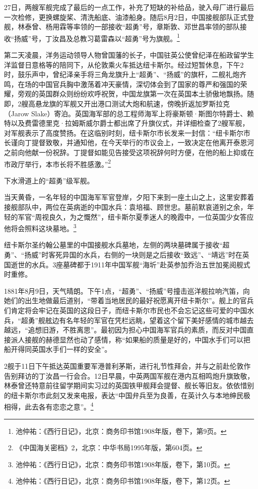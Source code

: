 \documentclass[12pt,UTF8]{ctexbook}
\begin{document}
27日，两艘军舰完成了最后的一点工作，补充了短缺的补给品，驶入母厂进行最后一次检修，更换螺旋桨、清洗船底、油漆船身。随后8月2日，中国接舰部队正式登舰，林泰曾、杨用霖等率领的一部接收“超勇”号，章斯敦、邓世昌率领的部队接收“扬威”号，丁汝昌及总教习葛雷森以“超勇”号为旗舰。\footnote{池仲祐：《西行日记》，北京：商务印书馆1908年版，卷下，第9页。}

第二天凌晨，洋务运动领导人物曾国藩的长子，中国驻英公使曾纪泽在船政留学生洋监督日意格等的陪同下，从伦敦乘火车抵达纽卡斯尔。经过短暂休息，下午2时，鼓乐声中，曾纪泽亲手将三角龙旗升上“超勇”、“扬威”的旗杆，二舰礼炮齐鸣，在场的中国官兵胸中激荡着冲天豪情，深切体会到了国家的尊严和强国的荣耀，旁观的英国群众则纷纷欢呼祝贺，中国龙旗第一次在英国本土骄傲地飘扬。随即，2艘高悬龙旗的军舰又开出港口测试大炮和航速，傍晚折返加罗斯拉克（Jarow Slake）寄泊。英国海军部的总工程师海军上将豪斯顿·斯图尔特爵士、赖特以及费雷德里克·拉姆斯威尔爵士都出席了升旗仪式，并详细检查了2艘军舰，对军舰表示了高度赞扬。在这临别时刻，纽卡斯尔市长发来一封信：“纽卡斯尔市长谨向丁提督致敬，并通知他，在今天举行的市议会上，一致决定在他离开泰恩河之前向他献一份祝辞。丁提督如能见告接受这项祝辞何时方便，在他的船上抑或在市政厅举行，本市长将不胜感激。”\footnote{《中国海关密档》2，北京：中华书局1995年版，第604页。}

下水滑道上的“超勇”级军舰。

当天黄昏，一名年轻的中国海军军官登岸，夕阳下来到一座土山之上，这里安葬着接舰部队中，两位在英病逝的中国水兵：袁培福、顾世忠。墓前默哀道别之余，年轻的军官“周视良久，为之慨然”，纽卡斯尔夏季迷人的晚霞中，一位英国少女答应他将会照料这块墓地。\footnote{池仲祐：《西行日记》，北京：商务印书馆1908年版，卷下，第10页。}

纽卡斯尔圣约翰公墓里的中国接舰水兵墓地，左侧的两块墓碑属于接收“超勇”、“扬威”时客死异国的水兵，右侧的一块则是之后接收“致远”、“靖远”时在英国逝世的水兵。3座墓碑都于1911年中国军舰“海圻”赴英参加乔治五世加冕阅舰式时重修。

1881年8月9日，天气晴朗。下午1点，“超勇”、“扬威”号撞击巡洋舰拉响汽笛，向她们的出生地做最后道别，“带着当地居民的最好祝愿离开纽卡斯尔”。舰上的官兵们肯定将会牢记在英国的这段日子，而纽卡斯尔市民也不会忘记这些可爱的中国水兵，“超勇”舰舷边有名年轻的军官在凭栏远眺，望着这个留下美好感情的城市越去越远，“追想旧游，不胜离思”。最初因为担心中国海军官兵的素质，而反对中国直接派人接舰的赫德显然也动了感情，称“如果船的质量是好的，中国水手们可以把船开得同英国水手们一样的安全”。

2舰于11日下午抵达英国重要军港普利茅斯，进行礼节性拜会，并与之前赴伦敦作告别拜访的丁汝昌一行会合。12日早晨，中英两国军舰在港内互相鸣炮升旗致敬，林泰曾还特意前往留学期间实习过的英国铁甲舰拜会提督、舰长等旧友。依依惜别的纽卡斯尔市此刻又发来电报，表达“中国弁兵至为良善，在英计久与本地绅民极相得，此去各有恋恋之意”。\footnote{池仲祐：《西行日记》，北京：商务印书馆1908年版，卷下，第12页。}
\end{document}
